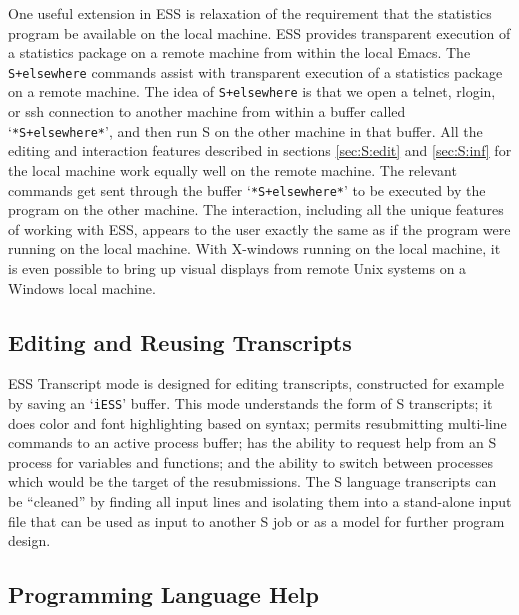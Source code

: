 \documentclass{article}
\newcommand{\stexttt}[1]{{\small\texttt{#1}}}
\newcommand{\file}[1]{`\stexttt{#1}'}
\begin{document}
One useful extension in ESS is relaxation of the requirement that the
statistics program be available on the local machine.  ESS provides
transparent execution of a statistics package on a remote machine from
within the local Emacs.  The \stexttt{S+elsewhere} commands assist
with transparent execution of a statistics package on a remote
machine.  The idea of \stexttt{S+elsewhere} is that we open a telnet,
rlogin, or ssh connection to another machine from within a buffer
called \file{*S+elsewhere*}, and then run S on the other machine in
that buffer.  All the editing and interaction features described in
sections \ref{sec:S:edit} and \ref{sec:S:inf} for the local machine
work equally well on the remote machine.  The relevant commands get
sent through the buffer \file{*S+elsewhere*} to be executed by the
program on the other machine.  The interaction, including all the
unique features of working with ESS, appears to the user exactly the
same as if the program were running on the local machine.  With
X-windows running on the local machine, it is even possible to bring
up visual displays from remote Unix systems on a Windows local
machine.

\subsection{Editing and Reusing Transcripts}
\label{sec:S:trans}

ESS Transcript mode is designed for editing transcripts, constructed for
example by saving an \file{iESS} buffer.  This mode understands the form
of S transcripts; it does color and font highlighting based on syntax;
permits resubmitting multi-line commands to an active process buffer;
has the ability to request help from an S process for variables and
functions; and the ability to switch between processes which would be
the target of the resubmissions.  The S language transcripts can be
``cleaned'' by finding all input lines and isolating them into a
stand-alone input file that can be used as input to another S job or as
a model for further program design.

\subsection{Programming Language Help}
\label{sec:S:help}
\end{document}
